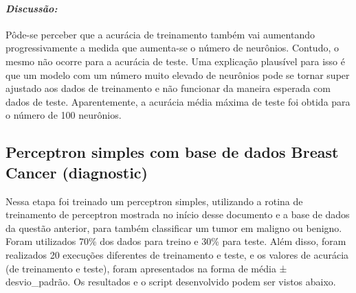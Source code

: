 \documentclass[
]{article}
\begin{document}
\hypertarget{discussuxe3o}{%
\paragraph{\texorpdfstring{\textbf{\emph{Discussão:}}}{Discussão:}}\label{discussuxe3o}}

Pôde-se perceber que a acurácia de treinamento também vai aumentando
progressivamente a medida que aumenta-se o número de neurônios. Contudo,
o mesmo não ocorre para a acurácia de teste. Uma explicação plausível
para isso é que um modelo com um número muito elevado de neurônios pode
se tornar super ajustado aos dados de treinamento e não funcionar da
maneira esperada com dados de teste. Aparentemente, a acurácia média
máxima de teste foi obtida para o número de 100 neurônios.

\hypertarget{perceptron-simples-com-base-de-dados-breast-cancer-diagnostic}{%
\subsection{Perceptron simples com base de dados Breast Cancer
(diagnostic)}\label{perceptron-simples-com-base-de-dados-breast-cancer-diagnostic}}

Nessa etapa foi treinado um perceptron simples, utilizando a rotina de
treinamento de perceptron mostrada no início desse documento e a base de
dados da questão anterior, para também classificar um tumor em maligno
ou benigno. Foram utilizados 70\% dos dados para treino e 30\% para
teste. Além disso, foram realizados 20 execuções diferentes de
treinamento e teste, e os valores de acurácia (de treinamento e teste),
foram apresentados na forma de média ± desvio\_padrão. Os resultados e o
script desenvolvido podem ser vistos abaixo.
\end{document}
